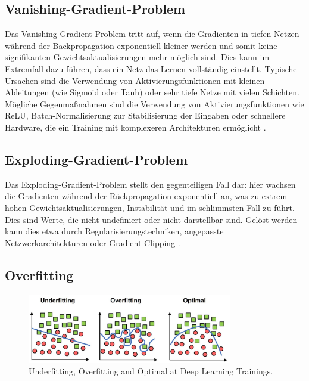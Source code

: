 \subsection{Vanishing-Gradient-Problem}

Das Vanishing-Gradient-Problem tritt auf, wenn die Gradienten in tiefen Netzen während der Backpropagation exponentiell kleiner werden und somit keine signifikanten Gewichtsaktualisierungen mehr möglich sind. Dies kann im Extremfall dazu führen, dass ein Netz das Lernen vollständig einstellt. Typische Ursachen sind die Verwendung von Aktivierungsfunktionen mit kleinen Ableitungen (wie Sigmoid oder Tanh) oder sehr tiefe Netze mit vielen Schichten. Mögliche Gegenmaßnahmen sind die Verwendung von Aktivierungsfunktionen wie \acrshort{ReLU}, Batch-Normalisierung zur Stabilisierung der Eingaben oder schnellere Hardware, die ein Training mit komplexeren Architekturen ermöglicht \cite{Alzubaidi2021}.  

\subsection{Exploding-Gradient-Problem}

Das Exploding-Gradient-Problem stellt den gegenteiligen Fall dar: hier wachsen die Gradienten während der Rückpropagation exponentiell an, was zu extrem hohen Gewichtsaktualisierungen, Instabilität und im schlimmsten Fall zu  führt. Dies sind Werte, die nicht undefiniert oder nicht darstellbar sind. Gelöst werden kann dies etwa durch Regularisierungstechniken, angepasste Netzwerkarchitekturen oder Gradient Clipping \cite{Alzubaidi2021}.  

\subsection{Overfitting}
\label{subsec:overfitting}

\begin{figure}[h]
    \centering
    \includegraphics[width=0.8\textwidth]{images/011Fundamentals/overfitting.jpg}
    \caption{Underfitting, Overfitting and Optimal at Deep Learning Trainings. \cite{overfitting_pic} }
    \label{fig:overfitting}
\end{figure}



